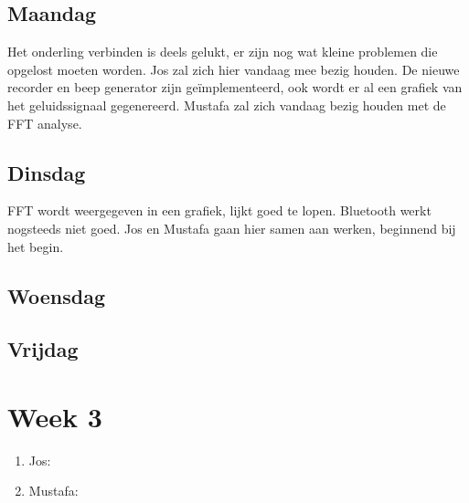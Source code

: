 \documentclass[12pt]{article}
\begin{document}
\subsection*{Maandag}
Het onderling verbinden is deels gelukt, er zijn nog wat kleine problemen die opgelost moeten worden. Jos zal zich hier vandaag mee bezig houden. De nieuwe recorder en beep generator zijn ge\"implementeerd, ook wordt er al een grafiek van het geluidssignaal gegenereerd. Mustafa zal zich vandaag bezig houden met de FFT analyse.
\subsection*{Dinsdag}
FFT wordt weergegeven in een grafiek, lijkt goed te lopen. Bluetooth werkt nogsteeds niet goed. Jos en Mustafa gaan hier samen aan werken, beginnend bij het begin.
\subsection*{Woensdag}
\subsection*{Vrijdag}

\section*{Week 3}
\begin{enumerate}
\item Jos:
\item Mustafa:
\end{enumerate}
\end{document}
